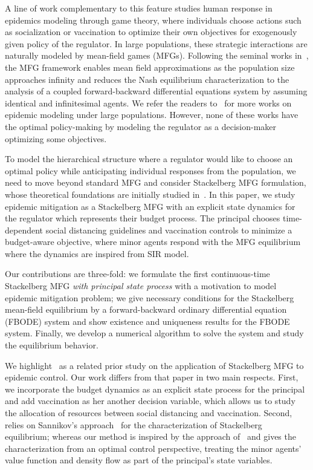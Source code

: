 \documentclass[letterpaper, 10 pt, conference]{ieeeconf}  %
\begin{document}
A line of work complementary to this feature studies human response in epidemics modeling through game theory, where individuals choose actions such as socialization or vaccination to optimize their own objectives for exogenously given policy of the regulator. In large populations, these strategic interactions are naturally modeled by mean-field games (MFGs). Following the seminal works in~\cite{Lasry_2007, Huang_2006}, the MFG framework enables mean field approximations as the population size approaches infinity and reduces the Nash equilibrium characterization to the analysis of a coupled forward-backward differential equations system by assuming identical and infinitesimal agents. We refer the readers to~\cite{cho2020mean,elie2020contact,aurell2022finite,Doncel_Gast_Gaujal_2022,olmez2022modeling,pnas_epidemics,liu2025incorporatingauthorityperceptioneconomic} for more works on epidemic modeling under large populations. However, none of these works have the optimal policy-making by modeling the regulator as a decision-maker optimizing some objectives.

To model the hierarchical structure where a regulator would like to choose an optimal policy while anticipating individual responses from the population, we need to move beyond standard MFG and consider Stackelberg MFG formulation, whose theoretical foundations are initially studied in~\cite{Elie2018ATail,carmonawang2021finite}. In this paper, we study epidemic mitigation as a Stackelberg MFG with an explicit state dynamics for the regulator which represents their budget process. The principal chooses time-dependent social distancing guidelines and vaccination controls to minimize a budget-aware objective, where minor agents respond with the MFG equilibrium where the dynamics are inspired from SIR model.


Our contributions are three-fold: we formulate the first continuous-time Stackelberg MFG \textit{with principal state process} with a motivation to model epidemic mitigation problem; we give necessary conditions for the Stackelberg mean-field equilibrium by a forward-backward ordinary differential equation (FBODE) system and show existence and uniqueness results for the FBODE system. Finally, we develop a numerical algorithm to solve the system and study the equilibrium behavior.



We highlight~\cite{aurell2022optimal} as a related prior study on the application of Stackelberg MFG to epidemic control. Our work differs from that paper in two main respects. First, we incorporate the budget dynamics as an explicit state process for the principal and add vaccination as her another decision variable, which allows us to study the allocation of resources between social distancing and vaccination. Second,~\cite{aurell2022optimal} relies on Sannikov’s approach~\cite{Sannikov2008AContinuous} for the characterization of Stackelberg equilibrium; whereas our method is inspired by the approach of~\cite{Bensoussan_2015} and gives the characterization from an optimal control perspective, treating the minor agents' value function and density flow as part of the principal’s state variables.
\end{document}
